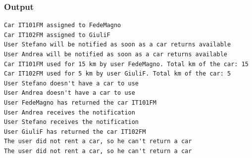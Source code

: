 \documentclass[]{article}
\begin{document}
\subsubsection*{Output}
\begin{verbatim}
Car IT101FM assigned to FedeMagno
Car IT102FM assigned to GiuliF
User Stefano will be notified as soon as a car returns available
User Andrea will be notified as soon as a car returns available
Car IT101FM used for 15 km by user FedeMagno. Total km of the car: 15
Car IT102FM used for 5 km by user GiuliF. Total km of the car: 5
User Stefano doesn't have a car to use
User Andrea doesn't have a car to use
User FedeMagno has returned the car IT101FM
User Andrea receives the notification
User Stefano receives the notification
User GiuliF has returned the car IT102FM
The user did not rent a car, so he can't return a car
The user did not rent a car, so he can't return a car
\end{verbatim}

   
\end{document}
